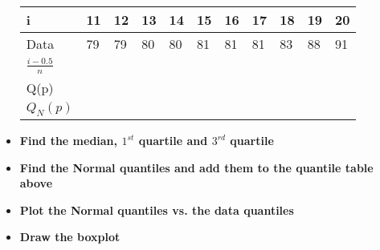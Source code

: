 \documentclass[11pt]{article}\usepackage[]{graphicx}\usepackage[]{color}
\begin{document}
\begin{itemize}
\begin{center}
\begin{tabular}{p{1cm} p{1cm}p{1cm}p{1cm}p{1cm}p{1cm} p{1cm}p{1cm}p{1cm}p{1cm}p{1cm}}
	\end{tabular}
\end{center}		

\begin{center}
	\begin{tabular}{p{1cm} p{1cm}p{1cm}p{1cm}p{1cm}p{1cm} p{1cm}p{1cm}p{1cm}p{1cm}p{1cm}}
		i &11 & 12 &  13&  14& 15 & 16  &17  &18 &19 &20  \\
		\hline
		Data& 79& 79& 80& 80& 81& 81& 81& 83& 88& 91\\
		\hline
				\vspace{.15cm}
		$\frac{i- 0.5}{n}$\vspace{.15cm}\\
		\hline
		\vspace{.15cm}
		Q(p)\vspace{.15cm}\\
		\hline
		\vspace{.15cm}
		$Q_N(p)$\vspace{.15cm}\\
		\hline

	\end{tabular}
\end{center}			
	 	
	 	\item \textbf{Find the median, $1^{st}$ quartile and   $3^{rd}$ quartile }	\\

		

\vspace{1.5cm}
	
		\item \textbf{Find the Normal quantiles and add them to the quantile table above}
		
		\item \textbf{Plot the Normal quantiles vs. the data quantiles}
		\vspace{7cm}
		\item \textbf{Draw the boxplot}
		
		
		
		
			\end{itemize}
\end{document}

